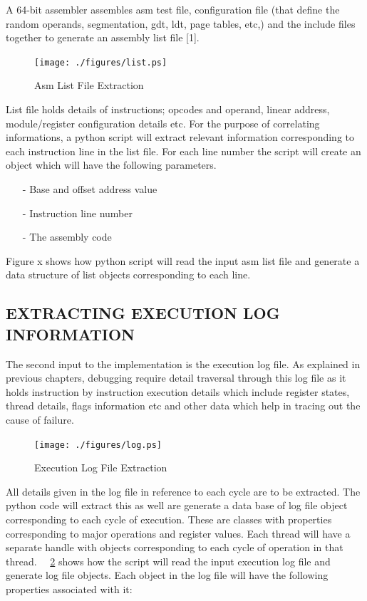 A 64-bit assembler assembles asm test file, configuration file (that define the random operands, segmentation, gdt, ldt, page tables, etc,) and the include files together to generate an assembly list file [1].
\begin{figure}[H]
\centering
\texttt{[image: ./figures/list.ps]}
\caption{Asm List File Extraction}
\label{fig:list.ps}

\end{figure}
List file holds details of instructions; opcodes and operand, linear address, module/register configuration details etc. For the purpose of correlating informations, a python script will extract relevant information corresponding to each instruction line in the list file.  For each line number the script will create an object which will have the following parameters.
\begin{itemize}
	\item[-] Base and offset address value
	\item[-] Instruction line number
	\item[-] The assembly code
\end{itemize}

Figure x shows how python script will read the input asm list file and generate a data structure of list objects corresponding to each line. 

\subsection {EXTRACTING EXECUTION LOG INFORMATION}
The second input to the implementation is the execution log file. As explained in previous chapters, debugging require detail traversal through this log file as it holds instruction by instruction execution details which include register states, thread details, flags information etc and other data which help in tracing out the cause of failure. 
\begin{figure}[H]
\centering
\texttt{[image: ./figures/log.ps]}
\caption{Execution Log File Extraction}
\label{fig:log.ps}
\end{figure}

All details given in the log file in reference to each cycle are to be extracted. The python code will extract this as well are generate a data base of log file object corresponding to each cycle of execution. These are classes with properties corresponding to major operations and register values. Each thread will have a separate handle with objects corresponding to each cycle of operation in that thread.  ~\figurename{~\ref{fig:log.ps}}  shows how the script will read the input execution log file and generate log file objects.
Each object in the log file will have the following properties associated with it:

